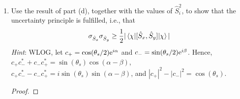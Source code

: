 \documentclass[../psets.tex]{subfiles}
\begin{document}
\begin{enumerate}
\begin{enumerate}
\begin{proof}
\begin{align*}
\begin{pmatrix}
                \end{pmatrix}
                \begin{pmatrix}
                    c_+\\
                    c_-\\
                \end{pmatrix}\\
                &= \frac{\hbar}{2}(c_+^*c_-+c_-^*c_+)\\
                \Aboxed{\ev{\hat{S}_x}{\chi} &= \hbar\re(c_+^*c_-)}
            \end{align*}
            For $\hat{S}_y$, we have
            \begin{align*}
                \ev{\hat{S}_y}{\chi} &= \frac{\hbar}{2}
                \begin{pmatrix}
                    c_+^* & c_-^*\\
                \end{pmatrix}
                \begin{pmatrix}
                    0 & -i\\
                    i & 0\\
                \end{pmatrix}
                \begin{pmatrix}
                    c_+\\
                    c_-\\
                \end{pmatrix}\\
                &= \frac{\hbar}{2}\cdot\frac{c_+^*c_--c_-^*c_+}{2i}\cdot 2\\
                \Aboxed{\ev{\hat{S}_y}{\chi} &= \hbar\im(c_+^*c_-)}
            \end{align*}
        \end{proof}
        \item Use the result of part (d), together with the values of $\hat{S}_i^2$, to show that the uncertainty principle is fulfilled, i.e., that
        \begin{equation}
            \sigma_{\hat{S}_x}\sigma_{\hat{S}_y} \geq \frac{1}{2}|\ev{[\hat{S}_x,\hat{S}_y]}{\chi}|
        \end{equation}
        \emph{Hint}: WLOG, let $c_+=\cos(\theta_s/2)\e[i\alpha]$ and $c_-=\sin(\theta_s/2)\e[i\beta]$. Hence, $c_+c_-^*+c_-c_+^*=\sin(\theta_s)\cos(\alpha-\beta)$, $c_+c_-^*-c_-c_+^*=i\sin(\theta_s)\sin(\alpha-\beta)$, and $|c_+|^2-|c_-|^2=\cos(\theta_s)$.
        \begin{proof}

\end{proof}
\end{enumerate}
\end{enumerate}
\end{document}
